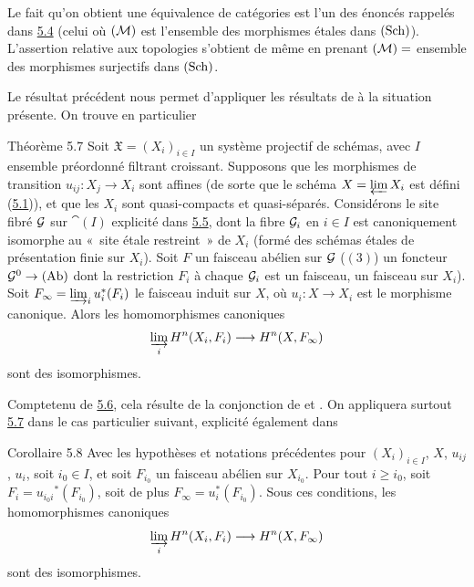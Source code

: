 \documentclass[10pt]{../fichiers-configuration-latex/smfart}
\begin{document}
Le fait qu'on obtient une équivalence de catégories est l'un des
énoncés rappelés dans \hyperref[VII.subsec5.4]{5.4} (celui où $({\mathcal M})$ est
l'ensemble des morphismes étales dans $(\operatorname{Sch})$). L'assertion
relative aux topologies s'obtient de même en prenant $({\mathcal M})=$
ensemble des morphismes surjectifs dans $(\operatorname{Sch})$.

Le résultat précédent nous permet d'appliquer les résultats de à la
situation présente. On trouve en particulier

\begin{enonce*}{Théorème 5.7}
Soit $\mathfrak{X} = (X_i)_{i \in I}$ un système projectif de
schémas, avec $I$ ensemble préordonné filtrant croissant. Supposons
que les morphismes de transition $u_{ij} : X_j \to X_i$ sont affines
(de sorte que le schéma $X = \varprojlim X_i$ est défini
(\hyperref[VII.subsec5.1]{5.1})), et que les $X_i$ sont quasi-compacts et
quasi-séparés. Considérons le site fibré ${\mathcal G}$ sur $\cat(I)$
explicité dans \hyperref[VII.subsec5.5]{5.5}, dont la fibre ${\mathcal G}_i$ en $i \in
I$ est canoniquement isomorphe au « site étale restreint » de
$X_i$ (formé des schémas étales de présentation finie sur $X_i$).
Soit $F$ un faisceau abélien sur ${\mathcal G}$ (\ie $(3)$) un foncteur
$\Gg^{0} \to (\Ab)$ dont la restriction $F_i$ à chaque ${\mathcal G}_i$ est
un faisceau, \ie un faisceau sur $X_i$). Soit $F_{\infty} =
\varinjlim_{i} u^{\ast}_i (F_i)$ le faisceau induit sur $X$, où
$u_i : X \to X_i$ est le morphisme canonique. Alors les
homomorphismes canoniques
$$
\varinjlim_i H^n (X_i, F_i) \to H^n (X, F_{\infty})
$$
sont des isomorphismes.
\end{enonce*}

Compte\pageoriginale tenu de \hyperref[VII.lem5.6]{5.6}, cela résulte de la conjonction de
 et .
On appliquera surtout \hyperref[VII.thm5.7]{5.7} dans le cas particulier suivant,
explicité également dans

\begin{enonce*}{Corollaire 5.8}
Avec les hypothèses et notations précédentes pour $(X_i)_{i \in I}$,
$X$, $u_{ij}$, $u_i$, soit $i_0 \in I$, et soit $F_{i_0}$ un faisceau
abélien sur $X_{i_0}$. Pour tout $i \geq i_0$, soit $F_i = u_{i_0 i}
{}^{\ast}(F_{i_0})$, soit de plus $F_{\infty} = u^{\ast}_i
(F_{i_0})$. Sous ces conditions, les homomorphismes canoniques
$$
\varinjlim_i H^n (X_i, F_i) \to H^n (X, F_{\infty})
$$
sont des isomorphismes.
\end{enonce*}
\end{document}
